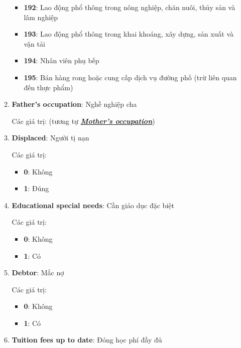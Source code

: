 \begin{itemize}
\begin{enumerate}
\begin{itemize}
              \item \textbf{192}: Lao động phổ thông trong nông nghiệp, chăn nuôi, thủy sản và lâm nghiệp
              \item \textbf{193}: Lao động phổ thông trong khai khoáng, xây dựng, sản xuất và vận tải
              \item \textbf{194}: Nhân viên phụ bếp
              \item \textbf{195}: Bán hàng rong hoặc cung cấp dịch vụ đường phố (trừ liên quan đến thực phẩm)
            \end{itemize}

            \item \textbf{Father's occupation}: Nghề nghiệp cha
    
            Các giá trị: (tương tự \hyperlink{line:1-mom-job}{\textit{\textbf{Mother's occupation}}})
    
            \item \textbf{Displaced}: Người tị nạn
            
            Các giá trị:
            \begin{itemize}
                \item \textbf{0}: Không
                \item \textbf{1}: Đúng
            \end{itemize}
    
             \item \textbf{Educational special needs}: Cần giáo dục đặc biệt
            
            Các giá trị:
            \begin{itemize}
                \item \textbf{0}: Không
                \item \textbf{1}: Có
            \end{itemize}
    
            \item \textbf{Debtor}: Mắc nợ
            
            Các giá trị:
            \begin{itemize}
                \item \textbf{0}: Không
                \item \textbf{1}: Có
            \end{itemize}
    
            \item \textbf{Tuition fees up to date}: Đóng học phí đầy đủ
            

\end{enumerate}
\end{itemize}
